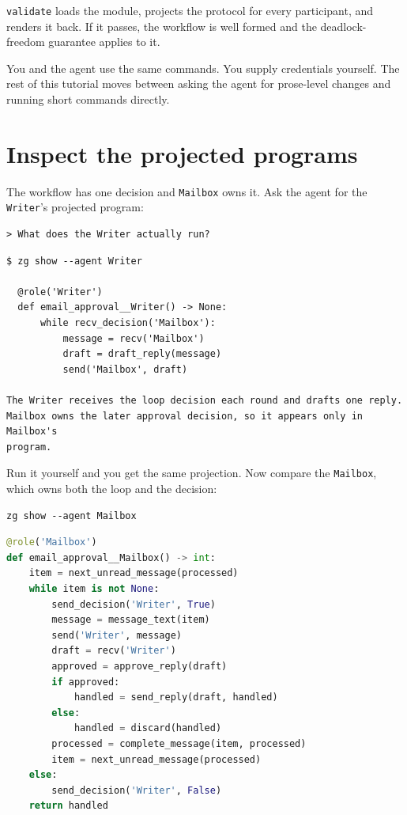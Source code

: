 \documentclass[11pt,a4paper]{article}
\begin{document}
\texttt{validate} loads the module, projects the protocol for every
participant, and renders it back. If it passes, the workflow is well formed and
the deadlock-freedom guarantee applies to it.

You and the agent use the same commands. You supply credentials yourself. The
rest of this tutorial moves between asking the agent for prose-level changes
and running short commands directly.

\section{Inspect the projected programs}

The workflow has one decision and \texttt{Mailbox} owns it. Ask the agent for
the \texttt{Writer}'s projected program:

\begin{lstlisting}[style=agent]
> What does the Writer actually run?
\end{lstlisting}

\begin{lstlisting}[style=agent]
  $ zg show --agent Writer

  @role('Writer')
  def email_approval__Writer() -> None:
      while recv_decision('Mailbox'):
          message = recv('Mailbox')
          draft = draft_reply(message)
          send('Mailbox', draft)

The Writer receives the loop decision each round and drafts one reply.
Mailbox owns the later approval decision, so it appears only in Mailbox's
program.
\end{lstlisting}

Run it yourself and you get the same projection. Now compare the
\texttt{Mailbox}, which owns both the loop and the decision:

\begin{lstlisting}[style=shell]
zg show --agent Mailbox
\end{lstlisting}

\begin{lstlisting}[language=Python]
@role('Mailbox')
def email_approval__Mailbox() -> int:
    item = next_unread_message(processed)
    while item is not None:
        send_decision('Writer', True)
        message = message_text(item)
        send('Writer', message)
        draft = recv('Writer')
        approved = approve_reply(draft)
        if approved:
            handled = send_reply(draft, handled)
        else:
            handled = discard(handled)
        processed = complete_message(item, processed)
        item = next_unread_message(processed)
    else:
        send_decision('Writer', False)
    return handled
\end{lstlisting}
\end{document}
